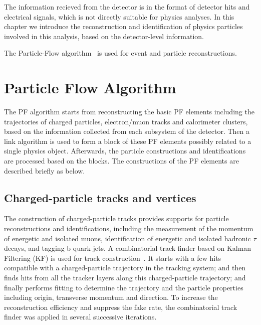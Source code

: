 The information recieved from the detector is in the format of detector hits and electrical signals, which is not directly suitable for physics analyses. In this chapter we introduce the reconstruction and identification of physics particles involved in this analysis, based on the detector-level information. 

\vspace{0.3cm}
The Particle-Flow algorithm~\cite{ob_pf} is used for event and particle reconstructions.

\section{Particle Flow Algorithm}
The PF algorithm starts from reconstructing the basic PF elements including the trajectories of charged particles, electron/muon tracks and calorimeter clusters, based on the information collected from each subsystem of the detector. Then a link algorithm is used to form a block of these PF elements possibly related to a single physics object. Afterwards, the particle constructions and identifications are processed based on the blocks. The constructions of the PF elements are described briefly as below.

\subsection{Charged-particle tracks and vertices}
The construction of charged-particle tracks provides supports for particle reconstructions and identifications, including the measurement of the momentum of energetic and isolated muons, identification of energetic and isolated hadronic $\tau$ decays, and tagging b quark jets. A combinatorial track finder based on Kalman Filtering (KF) is used for track construction~\cite{ob_trackconst1,ob_trackconst2}. It starts with a few hits compatible with a charged-particle trajectory in the tracking system; and then finds hits from all the tracker layers along this charged-particle trajectory; and finally performs fitting to determine the trajectory and the particle properties including origin, transverse momentum and direction. To increase the reconstruction efficiency and suppress the fake rate, the combinatorial track finder was applied in several successive iterations.

